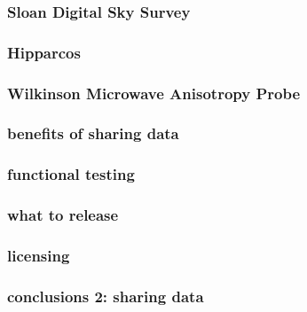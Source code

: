 \documentclass[pdftex]{beamer}
\begin{document}
\begin{frame}
  \frametitle{Sloan Digital Sky Survey}
\end{frame}

\begin{frame}
  \frametitle{Hipparcos}
\end{frame}

\begin{frame}
  \frametitle{Wilkinson Microwave Anisotropy Probe}
\end{frame}

\begin{frame}
  \frametitle{benefits of sharing data}
\end{frame}

\begin{frame}
  \frametitle{functional testing}
\end{frame}

\begin{frame}
  \frametitle{what to release}
\end{frame}

\begin{frame}
  \frametitle{licensing}
\end{frame}

\begin{frame}
  \frametitle{conclusions 2: sharing data}
\end{frame}
\end{document}
